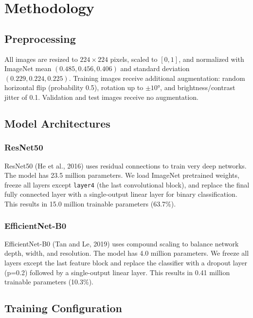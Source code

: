 \documentclass[12pt, a4paper]{article}
\begin{document}
\section{Methodology}

\subsection{Preprocessing}
All images are resized to $224 \times 224$ pixels, scaled to $[0, 1]$, and normalized with ImageNet mean $(0.485, 0.456, 0.406)$ and standard deviation $(0.229, 0.224, 0.225)$. Training images receive additional augmentation: random horizontal flip (probability 0.5), rotation up to $\pm 10°$, and brightness/contrast jitter of 0.1. Validation and test images receive no augmentation.

\subsection{Model Architectures}

\subsubsection{ResNet50}
ResNet50 (He et al., 2016) uses residual connections to train very deep networks. The model has 23.5 million parameters. We load ImageNet pretrained weights, freeze all layers except \texttt{layer4} (the last convolutional block), and replace the final fully connected layer with a single-output linear layer for binary classification. This results in 15.0 million trainable parameters (63.7\%).

\subsubsection{EfficientNet-B0}
EfficientNet-B0 (Tan and Le, 2019) uses compound scaling to balance network depth, width, and resolution. The model has 4.0 million parameters. We freeze all layers except the last feature block and replace the classifier with a dropout layer (p=0.2) followed by a single-output linear layer. This results in 0.41 million trainable parameters (10.3\%).

\subsection{Training Configuration}
\end{document}
